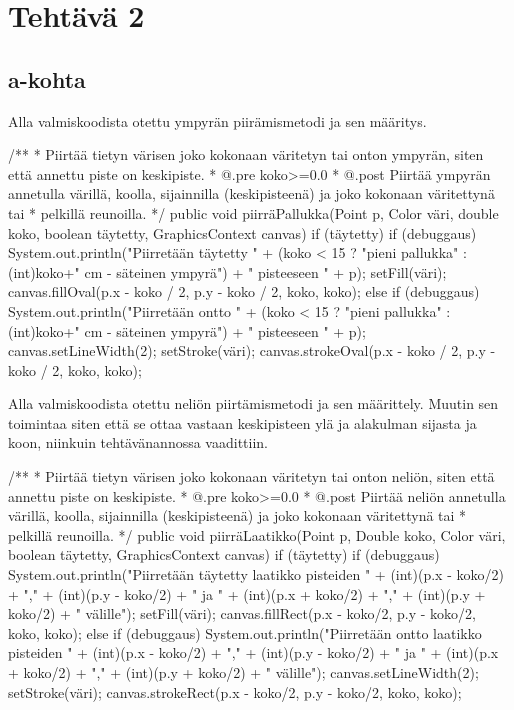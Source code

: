 
\chapter{Tehtävä 2 \label{chap:Teht=0000E4v=0000E4-2}}

\section{a-kohta}
\label{a-kohta}
Alla valmiskoodista otettu ympyrän piirämismetodi ja sen määritys.
\begin{javacode}
/**
* Piirtää tietyn värisen joko kokonaan väritetyn tai onton ympyrän, siten että annettu piste on keskipiste.
* @.pre koko>=0.0
* @.post Piirtää ympyrän annetulla värillä, koolla, sijainnilla (keskipisteenä) ja joko kokonaan väritettynä tai
* pelkillä reunoilla.
*/
  public void piirräPallukka(Point p, Color väri, double koko, boolean täytetty, GraphicsContext canvas) {
        if (täytetty){
            if (debuggaus) System.out.println("Piirretään täytetty " + (koko < 15 ? "pieni pallukka" : (int)koko+" cm - säteinen ympyrä") + " pisteeseen " + p);
            setFill(väri);
            canvas.fillOval(p.x - koko / 2, p.y - koko / 2, koko, koko);
        } else {
            if (debuggaus) System.out.println("Piirretään ontto " + (koko < 15 ? "pieni pallukka" : (int)koko+" cm - säteinen ympyrä") + " pisteeseen " + p);
            canvas.setLineWidth(2);
            setStroke(väri);
            canvas.strokeOval(p.x - koko / 2, p.y - koko / 2, koko, koko);
        }
    }
\end{javacode}

Alla valmiskoodista otettu neliön piirtämismetodi ja sen määrittely.
Muutin sen toimintaa siten että se ottaa vastaan keskipisteen ylä ja alakulman sijasta
ja koon, niinkuin tehtävänannossa vaadittiin.
\begin{javacode}
/**
* Piirtää tietyn värisen joko kokonaan väritetyn tai onton neliön, siten että annettu piste on keskipiste.
* @.pre koko>=0.0
* @.post Piirtää neliön annetulla värillä, koolla, sijainnilla (keskipisteenä) ja joko kokonaan väritettynä tai
* pelkillä reunoilla.
*/
    public void piirräLaatikko(Point p, Double koko, Color väri, boolean täytetty, GraphicsContext canvas) {
        if (täytetty) {
            if (debuggaus) System.out.println("Piirretään täytetty laatikko pisteiden " + (int)(p.x - koko/2) + "," + (int)(p.y - koko/2) + " ja " + (int)(p.x + koko/2) + "," + (int)(p.y + koko/2) + " välille");
            setFill(väri);
            canvas.fillRect(p.x - koko/2, p.y - koko/2, koko, koko);
        } else {
            if (debuggaus) System.out.println("Piirretään ontto laatikko pisteiden " + (int)(p.x - koko/2) + "," + (int)(p.y - koko/2) + " ja " + (int)(p.x + koko/2) + "," + (int)(p.y + koko/2) + " välille");
            canvas.setLineWidth(2);
            setStroke(väri);
            canvas.strokeRect(p.x - koko/2, p.y - koko/2, koko, koko);
        }
    }
\end{javacode}

